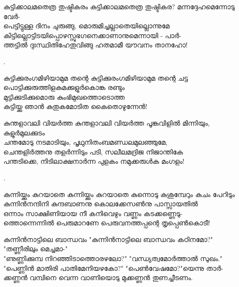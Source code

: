 \begin{enumerate}

\begin{slokam}{\VSv}{\VNM}{കുട്ടിക്കാലമതെത്ര തുഷ്ടികരം}
കുട്ടിക്കാലമതെത്ര തുഷ്ടികര? മന്നദ്ദേഹമെന്നോടു വേർ-\\
പെട്ടിട്ടുള്ള ദിനം ചുരുങ്ങു, മൊരുമിച്ചല്ലാതെയില്ലൊന്നുമേ\\
കിട്ടില്ലൊട്ടിടയിപ്പൊഴസ്സുഭഗനെക്കാണാനുമെന്നായി - പാർ-\\
ത്തട്ടിൽ ദുഃസ്ഥിതിഹേതുവിങ്ങു ഹതമാമീ യൗവനം താനഹോ!
\end{slokam}


.

\begin{slokam}{\VVt}{\VenM}{കുട്ടിക്കുരംഗമിഴിയാമുമ തന്റെ}
കുട്ടിക്കുരംഗമിഴിയാമുമ തന്റെ ചട്ട \\
പൊട്ടിക്കുരുത്തിളകുമക്കുളുർകൊങ്ക രണ്ടും \\
മുട്ടിക്കുടിക്കുമൊരു കുംഭിമുഖത്തൊടൊത്ത \\
കുട്ടിയ്ക്കു ഞാൻ കുതുകമോടിത കൈതൊഴുന്നേൻ!
\end{slokam}


\begin{slokam}{\VKm}{\VNM}{കുന്തളാവലി വിയർത്ത}
കുന്തളാവലി വിയർത്ത പൂങ്കവിളിൽ മിന്നിയും, കുളുർമുലക്കുടം\\
ചന്തമോടു നടമാടിയും, പൃഥുനിതംബമണ്ഡലമുലഞ്ഞുമേ,\\
ചെന്തളിർത്തനു തളർന്നിടും പടി, സലീലമദ്രിജ നിജാന്തികേ\\
പന്തടിക്കെ, നിടിലാക്ഷനാർന്ന പുളകം നമുക്കരുള്‍ക മംഗളം!
\end{slokam}



.


\begin{slokam}{\VSv}{\SVL}{കുന്നിയ്ക്കും കുറയാതെ}
കുന്നിയ്ക്കും കുറയാതെ കുന്നൊടു കുശുമ്പേറും കുചം പേറിടും\\
കുന്നിൻനന്ദിനി കുന്ദബാണനു കൊലക്കേസൺനു പാസ്സായതിൽ\\
ഒന്നാം സാക്ഷിണിയായ നീ കനിവെഴും വണ്ണം കടക്കണ്ണെടു-\\
ത്തൊന്നെന്നിൽ പെരുമാറണേ പെരുവനത്തപ്പന്റെ തൃപ്പെൺകൊടീ!
\end{slokam}



\begin{slokam}{\VSv}{\RV}{കുന്നിൻനാട്ടിലെ ബാന്ധവം}
"കുന്നിൻനാട്ടിലെ ബാന്ധവം കഠിനമോ?" "തണ്ണീരിലും മെച്ചമാ-"\\
"ണുണ്ണിക്കുമ്പ നിറഞ്ഞിടാത്തൊരഴലോ?" "വന്ധ്യത്വമോർത്താൽ സുഖം."\\
"പെണ്ണിൻ മാതിരി പാതിമേനിയഴകോ?" "പെൺവേഷമോ?"യെന്നു താർ-\\
ക്കണ്ണൻ വമ്പിനെ വെന്ന വാണിയൊടു മുക്കണ്ണൻ തുണച്ചീടണം.
\end{slokam}


\end{enumerate}
